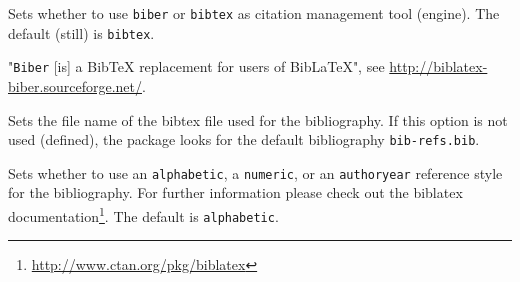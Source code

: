 \documentclass{ltxdockit}
\begin{document}
\begin{optionlist}

Sets whether to use \texttt{biber} or \texttt{bibtex} as citation management tool (engine).
The default (still) is \texttt{bibtex}.

"\texttt{Biber} [is] a BibTeX replacement for users of BibLaTeX", see \url{http://biblatex-biber.sourceforge.net/}.


Sets the file name of the bibtex file used for the bibliography.
If this option is not used (defined), the package looks for the default bibliography \texttt{bib-refs.bib}.


Sets whether to use an \texttt{alphabetic}, a \texttt{numeric}, or an \texttt{authoryear} reference style for the bibliography.
For further information please check out the biblatex documentation\footnote{\url{http://www.ctan.org/pkg/biblatex}}.
The default is \texttt{alphabetic}.

\end{optionlist}
\end{document}
